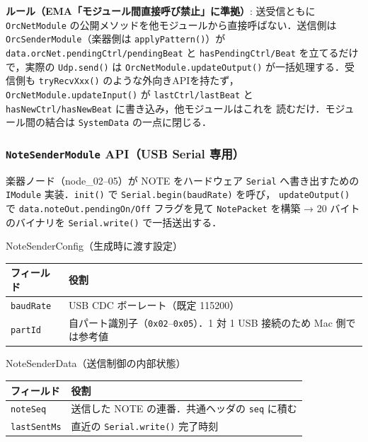 \documentclass[lualatex,book,paper=a4paper,jafontsize=11.5pt,jafontscale=1.05]{jlreq}
\begin{document}
\textbf{ルール（EMA「モジュール間直接呼び禁止」に準拠）}: 送受信ともに \texttt{OrcNetModule}
の公開メソッドを他モジュールから直接呼ばない．送信側は \texttt{OrcSenderModule}（楽器側は
\texttt{applyPattern()}）が \texttt{data.orcNet.pendingCtrl/pendingBeat} と
\texttt{hasPendingCtrl/Beat} を立てるだけで，実際の \texttt{Udp.send()} は
\texttt{OrcNetModule.updateOutput()} が一括処理する．受信側も
\texttt{tryRecvXxx()} のような外向きAPIを持たず，\texttt{OrcNetModule.updateInput()} が
\texttt{lastCtrl/lastBeat} と \texttt{hasNewCtrl/hasNewBeat} に書き込み，他モジュールはこれを
読むだけ．モジュール間の結合は \texttt{SystemData} の一点に閉じる．

\subsubsection{\texttt{NoteSenderModule} API（USB Serial 専用）}

楽器ノード（node\_02--05）が NOTE をハードウェア \texttt{Serial} へ書き出すための
\texttt{IModule} 実装．\texttt{init()} で \texttt{Serial.begin(baudRate)} を呼び，
\texttt{updateOutput()} で \texttt{data.noteOut.pendingOn/Off} フラグを見て
\texttt{NotePacket} を構築 → 20 バイトのバイナリを \texttt{Serial.write()} で一括送出する．

\begin{apibox}{NoteSenderConfig（生成時に渡す設定）}
\begin{tabular}{l p{}}
\toprule
\textbf{フィールド} & \textbf{役割} \\
\midrule
\texttt{baudRate} & USB CDC ボーレート（既定 115200） \\
\texttt{partId}   & 自パート識別子（\texttt{0x02}--\texttt{0x05}）．1 対 1 USB 接続のため Mac 側では参考値 \\
\bottomrule
\end{tabular}
\end{apibox}

\begin{apibox}{NoteSenderData（送信制御の内部状態）}
\begin{tabular}{l p{}}
\toprule
\textbf{フィールド} & \textbf{役割} \\
\midrule
\texttt{noteSeq}    & 送信した NOTE の連番．共通ヘッダの \texttt{seq} に積む \\
\texttt{lastSentMs} & 直近の \texttt{Serial.write()} 完了時刻 \\
\bottomrule
\end{tabular}
\end{apibox}
\end{document}
